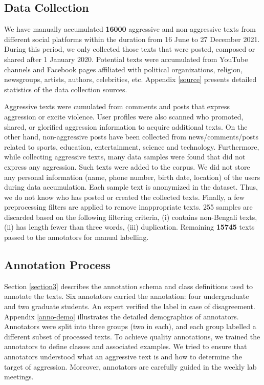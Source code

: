 \documentclass[11pt]{article}
\begin{document}
\subsection{Data Collection}
We have manually accumulated {\textbf{16000}} aggressive and non-aggressive texts from different social platforms within the duration from 16 June to 27 December 2021. During this period, we only collected those texts that were posted, composed or shared after 1 January 2020. Potential texts were accumulated from YouTube channels and Facebook pages affiliated with political organizations, religion, newsgroups, artists, authors, celebrities, etc. Appendix \ref{source} presents detailed statistics of the data collection sources.

Aggressive texts were cumulated from comments and posts that express aggression or excite violence. User profiles were also scanned who promoted, shared, or glorified aggression information to acquire additional texts. On the other hand, non-aggressive posts have been collected from news/comments/posts related to sports, education, entertainment, science and technology. Furthermore, while collecting aggressive texts, many data samples were found that did not express any aggression. Such texts were added to the corpus. We did not store any personal information (name, phone number, birth date, location) of the users during data accumulation. Each sample text is anonymized in the dataset. Thus, we do not know who has posted or created the collected texts. Finally, a few preprocessing filters are applied to remove inappropriate texts. 255 samples are discarded based on the following filtering criteria, (i) contains non-Bengali texts, (ii) has length fewer than three words, (iii) duplication. Remaining {\textbf{15745}} texts passed to the annotators for manual labelling. 

\subsection{Annotation Process}
Section \ref{section3} describes the annotation schema and class definitions used to annotate the texts. Six annotators carried the annotation: four undergraduate and two graduate students. An expert verified the label in case of disagreement. Appendix \ref{anno-demo} illustrates the detailed demographics of annotators. Annotators were split into three groups (two in each), and each group labelled a different subset of processed texts. To achieve quality annotations, we trained the annotators to define classes and associated examples. We tried to ensure that annotators understood what an aggressive text is and how to determine the target of aggression. Moreover, annotators are carefully guided in the weekly lab meetings. 
\end{document}
